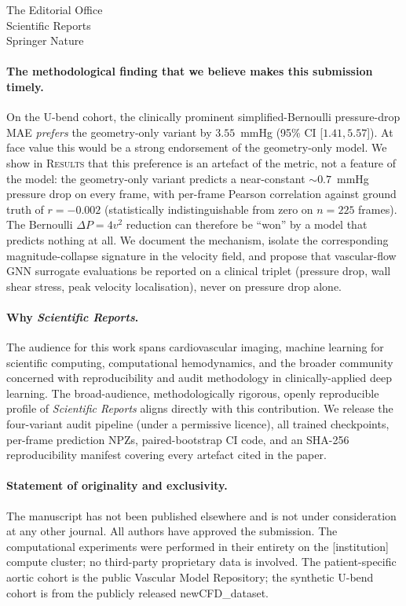 \documentclass[11pt,a4paper]{letter}
\begin{document}
\begin{letter}{The Editorial Office\\
Scientific Reports\\
Springer Nature}
\paragraph{The methodological finding that we believe makes this
submission timely.}
On the U-bend cohort, the clinically prominent simplified-Bernoulli
pressure-drop MAE \emph{prefers} the geometry-only variant by
$3.55$~mmHg (95\% CI [$1.41, 5.57$]). At face value this would be a
strong endorsement of the geometry-only model. We show in
\textsc{Results} that this preference is an artefact of the
metric, not a feature of the model: the geometry-only variant
predicts a near-constant $\sim\!0.7$~mmHg pressure drop on every
frame, with per-frame Pearson correlation against ground truth of
$r=-0.002$ (statistically indistinguishable from zero on $n=225$
frames). The Bernoulli $\Delta P = 4 v^2$ reduction can therefore be
``won'' by a model that predicts nothing at all. We document the
mechanism, isolate the corresponding magnitude-collapse signature
in the velocity field, and propose that vascular-flow GNN
surrogate evaluations be reported on a clinical triplet
(pressure drop, wall shear stress, peak velocity localisation),
never on pressure drop alone.

\paragraph{Why \textit{Scientific Reports}.}
The audience for this work spans cardiovascular imaging, machine
learning for scientific computing, computational hemodynamics, and
the broader community concerned with reproducibility and audit
methodology in clinically-applied deep learning. The
broad-audience, methodologically rigorous, openly reproducible
profile of \textit{Scientific Reports} aligns directly with this
contribution. We release the four-variant audit pipeline (under a
permissive licence), all trained checkpoints, per-frame prediction
NPZs, paired-bootstrap CI code, and an SHA-256 reproducibility
manifest covering every artefact cited in the paper.

\paragraph{Statement of originality and exclusivity.}
The manuscript has not been published elsewhere and is not under
consideration at any other journal. All authors have approved the
submission. The computational experiments were performed in their
entirety on the [institution] compute cluster; no third-party
proprietary data is involved. The patient-specific aortic cohort is
the public Vascular Model Repository; the synthetic U-bend cohort
is from the publicly released newCFD\_dataset.


\end{letter}
\end{document}
